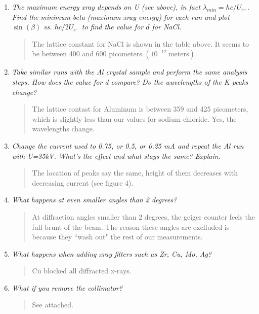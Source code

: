 \documentclass{amsart}
\begin{document}
\begin{enumerate}
\item {\textit{The maximum energy xray depends on U (see above), in fact $\lambda_{min}={hc}/{U_{e^-}}$. Find the minimum beta (maximum xray energy) for each run and plot $\sin(\beta)$ vs. ${hc}/{2U_{e^-}}$ to find the value for $d$ for NaCl.}
\begin{quote}
The lattice constant for NaCl is shown in the table above. It seems to be between 400 and 600 picometers $(10^{-12} \ \text{meters})$.
\end{quote}}


\item {\textit{Take similar runs with the Al crystal sample and perform the same analysis steps. How does the value for d compare? Do the wavelengths of the K peaks change?}
\begin{quote}
The lattice contast for Aluminum is between 359 and 425 picometers, which is slightly less than our values for sodium chloride. Yes, the wavelengths change.
\end{quote}}

\item {\textit{Change the current used to 0.75, or 0.5, or 0.25 mA and repeat the Al run with U=35kV. What's the effect and what stays the same? Explain.}
\begin{quote}
The location of peaks say the same, height of them decreases with decreasing current (see figure 4).
\end{quote}}

\item {\textit{What happens at even smaller angles than 2 degrees?}
\begin{quote}
At diffraction angles smaller than 2 degrees, the geiger counter feels the full brunt of the beam. The reason these angles are exclluded is because they ``wash out" the rest of our measurements.
\end{quote}}

\item{\textit{What happens when adding xray filters such as Zr, Cu, Mo, Ag?}
\begin{quote}
Cu blocked all diffracted x-rays.
\end{quote}}

\item{\textit{What if you remove the collimator?}
\begin{quote}
See attached.
\end{quote}}

\end{enumerate}
\end{document}
